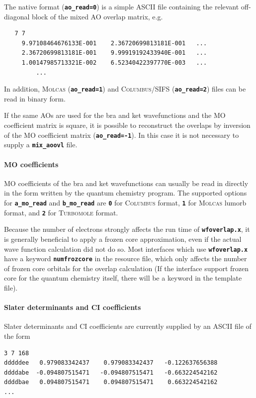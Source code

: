 \documentclass[a4paper,10pt,DIV=15,openany,twoside=false]{scrbook}
\newcommand{\ttt}[1]{\textbf{\texttt{#1}}}
\newenvironment{example}{
  \setlength{\OuterFrameSep}{3pt}
  \vspace{0mm}
  \definecolor{shadecolor}{HTML}{E4F4FF}
  \begin{shaded}
}{
  \end{shaded}
}
\begin{document}
The native format (\ttt{ao\_read=0}) is a simple ASCII file containing the relevant off-diagonal block of the mixed AO overlap matrix, e.g.

\begin{example}
\begin{verbatim}
   7 7
     9.97108464676133E-001    2.36720699813181E-001   ...
     2.36720699813181E-001    9.99919192433940E-001   ...
     1.00147985713321E-002    6.52340422397770E-003   ...
         ...
\end{verbatim}
\end{example}

In addition, \textsc{Molcas} (\ttt{ao\_read=1}) and \textsc{Columbus/SIFS} (\ttt{ao\_read=2}) files can be read in binary form.

If the same AOs are used for the bra and ket wavefunctions and the MO coefficient matrix is square, it is possible to reconstruct the overlaps by inversion of the MO coefficient matrix (\ttt{ao\_read=-1}).
In this case it is not necessary to supply a \ttt{mix\_aoovl} file.

\paragraph{MO coefficients}

MO coefficients of the bra and ket wavefunctions can usually be read in directly in the form written by the quantum chemistry program.
The supported options for \ttt{a\_mo\_read} and \ttt{b\_mo\_read} are \ttt{0} for \textsc{Columbus} format, \ttt{1} for \textsc{Molcas} lumorb format, and \ttt{2} for \textsc{Turbomole} format.

Because the number of electrons strongly affects the run time of \ttt{wfoverlap.x}, it is generally beneficial to apply a frozen core approximation, even if the actual wave function calculation did not do so.
Most interfaces which use \ttt{wfoverlap.x} have a keyword \ttt{numfrozcore} in the resource file, which only affects the number of frozen core orbitals for the overlap calculation (If the interface support frozen core for the quantum chemistry itself, there will be a keyword in the template file).


\paragraph{Slater determinants and CI coefficients}

Slater determinants and CI coefficients are currently supplied by an ASCII file of the form
%
\begin{example}
\begin{verbatim}
3 7 168
dddddee   0.979083342437    0.979083342437   -0.122637656388
ddddabe  -0.094807515471   -0.094807515471   -0.663224542162
ddddbae   0.094807515471    0.094807515471    0.663224542162
...
\end{verbatim}
\end{example}
\end{document}
